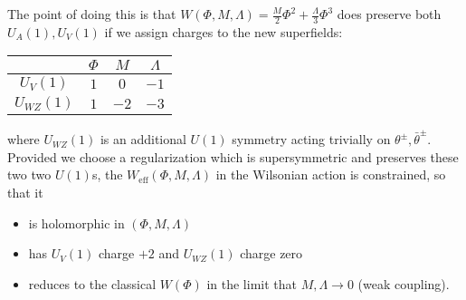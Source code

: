 The point of doing this is that $W(\Phi,M,\Lambda)=\frac{M}{2}\Phi^2 + \frac{\Lambda}{3}\Phi^3$ does preserve both $U_A(1),U_V(1)$ if we assign charges to the new superfields:
\begin{center}
    \begin{tabular}{c|c c c}
         & $\Phi$ & $M$ & $\Lambda$ \\\hline
         $U_V(1)$ & $1$ & $0$ & $-1$ \\
         $U_{WZ}(1)$ & $1$ & $-2$ & $-3$
    \end{tabular}
\end{center}
where $U_{WZ}(1)$ is an additional $U(1)$ symmetry acting trivially on $\theta^\pm, \bar \theta^\pm$. Provided we choose a regularization which is supersymmetric and preserves these two two $U(1)$s, the $W_\text{eff}(\Phi,M,\Lambda)$ in the Wilsonian action is constrained, so that it
\begin{itemize}
    \item is holomorphic in $(\Phi,M,\Lambda)$
    \item has $U_V(1)$ charge $+2$ and $U_{WZ}(1)$ charge zero
    \item reduces to the classical $W(\Phi)$ in the limit that $M,\Lambda \to 0$ (weak coupling).
\end{itemize}